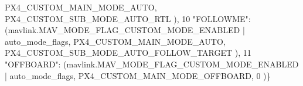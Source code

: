 \begin{DoxyCode}
                                                             PX4\_CUSTOM\_MAIN\_MODE\_AUTO,        
      PX4\_CUSTOM\_SUB\_MODE\_AUTO\_RTL            ),
10             \textcolor{stringliteral}{"FOLLOWME"}:      (mavlink.MAV\_MODE\_FLAG\_CUSTOM\_MODE\_ENABLED | auto\_mode\_flags,                 
                                                             PX4\_CUSTOM\_MAIN\_MODE\_AUTO,        
      PX4\_CUSTOM\_SUB\_MODE\_AUTO\_FOLLOW\_TARGET  ),
11             \textcolor{stringliteral}{"OFFBOARD"}:      (mavlink.MAV\_MODE\_FLAG\_CUSTOM\_MODE\_ENABLED | auto\_mode\_flags,                 
                                                             PX4\_CUSTOM\_MAIN\_MODE\_OFFBOARD,    0                  
                           )\}
\end{DoxyCode}
